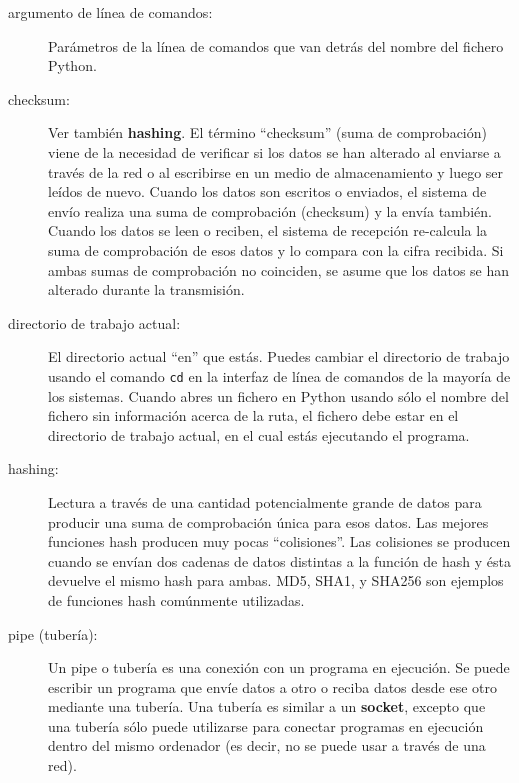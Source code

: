 \begin{description}

\item[argumento de línea de comandos:] Parámetros de la línea de comandos que van detrás del nombre
del fichero Python.

\item[checksum:] Ver también {\bf hashing}.  El término ``checksum'' (suma de comprobación)
viene de la necesidad de verificar si los datos se han alterado al
enviarse a través de la red o al escribirse en un medio de almacenamiento y luego
ser leídos de nuevo. Cuando los datos son escritos o enviados, el sistema de envío
realiza una suma de comprobación (checksum) y la envía también. Cuando los
datos se leen o reciben, el sistema de recepción re-calcula la suma de comprobación
de esos datos y lo compara con la cifra recibida. Si ambas sumas de comprobación no coinciden,
se asume que los datos se han alterado durante la transmisión.

\item[directorio de trabajo actual:] El directorio actual ``en''
que estás. Puedes cambiar el directorio de trabajo usando el comando
{\tt cd} en la interfaz de línea de comandos de la mayoría de los sistemas.
Cuando abres un fichero en Python usando sólo el nombre del fichero sin información
acerca de la ruta, el fichero debe estar en el directorio de trabajo actual,
en el cual estás ejecutando el programa.

\item[hashing:] Lectura a través de una cantidad potencialmente grande de datos
para producir una suma de comprobación única para esos datos. Las mejores funciones hash
producen muy pocas ``colisiones''. Las colisiones se producen cuando se envían dos cadenas de datos
distintas a la función de hash y ésta devuelve el mismo hash para ambas.
MD5, SHA1, y SHA256 son ejemplos de funciones hash comúnmente utilizadas.

\item[pipe (tubería):] Un pipe o tubería es una conexión con un programa en ejecución. Se
puede escribir un programa que envíe datos a otro o reciba datos desde ese otro
mediante una tubería. Una tubería es similar a un
{\bf socket}, excepto que una tubería sólo puede utilizarse
para conectar programas en ejecución dentro del mismo ordenador
(es decir, no se puede usar a través de una red).


\end{description}
